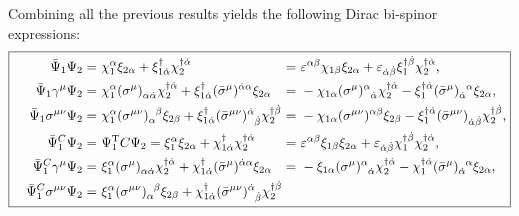 Combining all the previous results yields the following Dirac bi-spinor expressions:
\begin{equation}
	\boxed{\hspace{1em}
	\begin{alignedat}{5}
		\bar{\Psi}_{1} \Psi_{2} &=\ && \chi_{1}^{\alpha} \xi_{2 \alpha} + \xi_{1 \dot{\alpha}}^{\dagger} \chi_{2}^{\dagger \dot{\alpha}}
		&&=\ && \eps^{\alpha \beta} \chi_{1 \beta} \xi_{2 \alpha} + \eps_{\dot{\alpha} \dot{\beta}} \xi_{1}^{\dagger \dot{\beta}} \chi_{2}^{\dagger \dot{\alpha}} \text{,} \\
%		
		\bar{\Psi}_{1} \gamma^{\mu} \Psi_{2} &=\ && \chi_{1}^{\alpha} \tensor{(\sigma^{\mu})}{_{\alpha \dot{\alpha}}} \chi_{2}^{\dagger \dot{\alpha}} + \xi_{1 \dot{\alpha}}^{\dagger} \tensor{(\bar{\sigma}^{\mu})}{^{\dot{\alpha} \alpha}} \xi_{2 \alpha}
		&&=\ && - \chi_{1 \alpha} \tensor{(\sigma^{\mu})}{^{\alpha}_{\dot{\alpha}}} \chi_{2}^{\dagger \dot{\alpha}} - \xi_{1}^{\dagger \dot{\alpha}} \tensor{(\bar{\sigma}^{\mu})}{_{\dot{\alpha}}^{\alpha}} \xi_{2 \alpha} \text{,} \\
%		
		\bar{\Psi}_{1} \sigma^{\mu \nu} \Psi_{2} &=\ && \chi_{1}^{\alpha} \tensor{(\sigma^{\mu \nu})}{_{\alpha} ^{\beta}} \xi_{2 \beta} + \xi_{1 \dot{\alpha}}^{\dagger} \tensor{(\bar{\sigma}^{\mu \nu})}{^{\dot{\alpha}}_{\dot{\beta}}} \chi_{2}^{\dagger \dot{\beta}}
		&&=\ && - \chi_{1 \alpha} \tensor{(\sigma^{\mu \nu})}{^{\alpha \beta}} \xi_{2 \beta} - \xi_{1}^{\dagger \dot{\alpha}} \tensor{(\bar{\sigma}^{\mu \nu})}{_{\dot{\alpha} \dot{\beta}}} \chi_{2}^{\dagger \dot{\beta}} \text{,} \\
%		
%
		\bar{\Psi}_{1}^{C} \Psi_{2} &=\ && \Psi_{1}^{\trans} C \Psi_{2} = \xi_{1}^{\alpha} \xi_{2 \alpha} + \chi_{1 \dot{\alpha}}^{\dagger} \chi_{2}^{\dagger \dot{\alpha}}
		&&=\ && \eps^{\alpha \beta} \xi_{1 \beta} \xi_{2 \alpha} + \eps_{\dot{\alpha} \dot{\beta}} \chi_{1}^{\dagger \dot{\beta}} \chi_{2}^{\dagger \dot{\alpha}} \text{,} \\
%		
		\bar{\Psi}_{1}^{C} \gamma^{\mu} \Psi_{2} &=\ && \xi_{1}^{\alpha} \tensor{(\sigma^{\mu})}{_{\alpha \dot{\alpha}}} \chi_{2}^{\dagger \dot{\alpha}} + \chi_{1 \dot{\alpha}}^{\dagger} \tensor{(\bar{\sigma}^{\mu})}{^{\dot{\alpha} \alpha}} \xi_{2 \alpha}
		&&=\ && - \xi_{1 \alpha} \tensor{(\sigma^{\mu})}{^{\alpha}_{\dot{\alpha}}} \chi_{2}^{\dagger \dot{\alpha}} -  \chi_{1}^{\dagger \dot{\alpha}} \tensor{(\bar{\sigma}^{\mu})}{_{\dot{\alpha}} ^{\alpha}} \xi_{2 \alpha} \text{,}\\
%		
		\bar{\Psi}_{1}^{C} \sigma^{\mu \nu} \Psi_{2} &=\ && \xi_{1}^{\alpha} \tensor{(\sigma^{\mu \nu})}{_\alpha ^\beta} \xi_{2 \beta} + \chi_{1 \dot{\alpha}}^{\dagger} \tensor{(\bar{\sigma}^{\mu \nu})}{^{\dot{\alpha}} _{\dot{\beta}}} \chi_{2}^{\dagger \dot{\beta}}

\end{alignedat}}
\end{equation}
